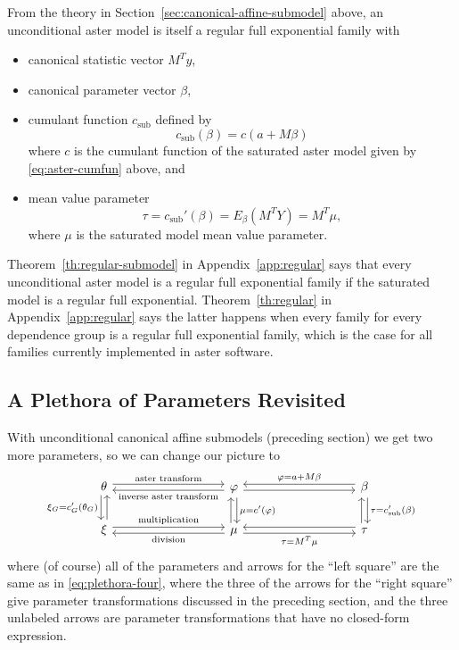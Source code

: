 From the theory in Section~\ref{sec:canonical-affine-submodel} above,
an unconditional aster model is itself a regular full exponential family
with
\begin{itemize}
\item canonical statistic vector $M^T y$,
\item canonical parameter vector $\beta$,
\item cumulant function $c_\text{sub}$ defined by
$$
   c_\text{sub}(\beta) = c(a + M \beta)
$$
where $c$ is the cumulant function of the saturated aster model given by
\eqref{eq:aster-cumfun} above, and
\item mean value parameter
$$
   \tau = c_\text{sub}'(\beta) = E_\beta(M^T Y) = M^T \mu,
$$
where $\mu$ is the saturated model mean value parameter.
\end{itemize}

Theorem~\ref{th:regular-submodel} in Appendix~\ref{app:regular} says
that every unconditional aster model is a regular full exponential family
if the saturated model is a regular full exponential.
Theorem~\ref{th:regular} in Appendix~\ref{app:regular} says the latter
happens when every family for every dependence group is a regular full
exponential family, which is the case for all families currently implemented
in aster software.

\subsection{A Plethora of Parameters Revisited}
\label{sec:revisited}

With unconditional canonical affine submodels (preceding section) we get
two more parameters, so we can change our picture to
\begin{equation} \label{eq:plethora-six}
\begin{tikzcd}[column sep=9em]
   \theta
   \arrow[r, "\text{aster transform}", shift left]
   \arrow[d, "\xi_G = c_G'(\theta_G)"', shift right]
   &
   \varphi
   \arrow[l, "\text{inverse aster transform}", shift left]
   \arrow[d, "\mu = c'(\varphi)", shift left]
   \arrow[r, shift right]
   &
   \beta
   \arrow[l, "\varphi = a + M \beta"', shift right]
   \arrow[d, "\tau = c_\text{sub}'(\beta)", shift left]
   \\
   \xi
   \arrow[u, shift right]
   \arrow[r, "\text{multiplication}", shift left]
   &
   \mu
   \arrow[l, "\text{division}", shift left]
   \arrow[u, shift left]
   \arrow[r, "\tau = M^T \mu"', shift right]
   &
   \tau
   \arrow[l, shift right]
   \arrow[u, shift left]
\end{tikzcd}
\end{equation}
where (of course) all of the parameters and arrows for the ``left square''
are the same as in \eqref{eq:plethora-four}, where the three of the arrows
for the ``right square'' give parameter transformations discussed in the
preceding section, and the three unlabeled arrows are parameter transformations
that have no closed-form expression.

